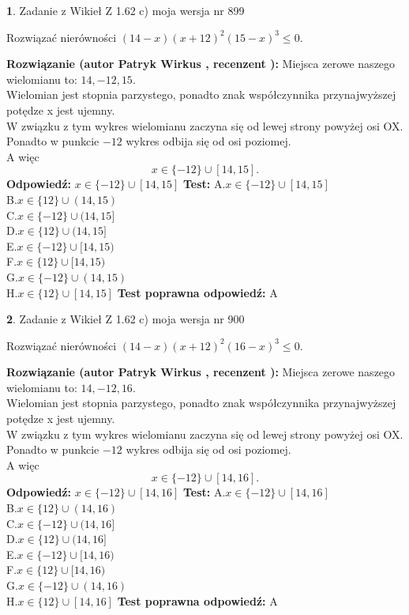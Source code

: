 \documentclass[12pt, a4paper]{article}
\theoremstyle{definition} %
\newtheorem{zad}{}
\newcommand{\zadStart}[1]{\begin{zad}#1\newline}
\newcommand{\zadStop}{\end{zad}}
\newcommand{\rozwStart}[2]{\noindent \textbf{Rozwiązanie (autor #1 , recenzent #2): }\newline}
\newcommand{\rozwStop}{\newline}
\newcommand{\odpStart}{\noindent \textbf{Odpowiedź:}\newline}
\newcommand{\odpStop}{\newline}
\newcommand{\testStart}{\noindent \textbf{Test:}\newline}
\newcommand{\testStop}{\newline}
\newcommand{\kluczStart}{\noindent \textbf{Test poprawna odpowiedź:}\newline}
\newcommand{\kluczStop}{\newline}
\begin{document}
\zadStart{Zadanie z Wikieł Z 1.62 c) moja wersja nr 899}

Rozwiązać nierówności $(14-x)(x+12)^{2}(15-x)^{3}\le0$.
\zadStop
\rozwStart{Patryk Wirkus}{}
Miejsca zerowe naszego wielomianu to: $14, -12, 15$.\\
Wielomian jest stopnia parzystego, ponadto znak współczynnika przy\linebreak najwyższej potędze x jest ujemny.\\ W związku z tym wykres wielomianu zaczyna się od lewej strony powyżej osi OX.\\
Ponadto w punkcie $-12$ wykres odbija się od osi poziomej.\\
A więc $$x \in \{-12\} \cup [14,15].$$
\rozwStop
\odpStart
$x \in \{-12\} \cup [14,15]$
\odpStop
\testStart
A.$x \in \{-12\} \cup [14,15]$\\
B.$x \in \{12\} \cup (14,15)$\\
C.$x \in \{-12\} \cup (14,15]$\\
D.$x \in \{12\} \cup (14,15]$\\
E.$x \in \{-12\} \cup [14,15)$\\
F.$x \in \{12\} \cup [14,15)$\\
G.$x \in \{-12\} \cup (14,15)$\\
H.$x \in \{12\} \cup [14,15]$
\testStop
\kluczStart
A
\kluczStop



\zadStart{Zadanie z Wikieł Z 1.62 c) moja wersja nr 900}

Rozwiązać nierówności $(14-x)(x+12)^{2}(16-x)^{3}\le0$.
\zadStop
\rozwStart{Patryk Wirkus}{}
Miejsca zerowe naszego wielomianu to: $14, -12, 16$.\\
Wielomian jest stopnia parzystego, ponadto znak współczynnika przy\linebreak najwyższej potędze x jest ujemny.\\ W związku z tym wykres wielomianu zaczyna się od lewej strony powyżej osi OX.\\
Ponadto w punkcie $-12$ wykres odbija się od osi poziomej.\\
A więc $$x \in \{-12\} \cup [14,16].$$
\rozwStop
\odpStart
$x \in \{-12\} \cup [14,16]$
\odpStop
\testStart
A.$x \in \{-12\} \cup [14,16]$\\
B.$x \in \{12\} \cup (14,16)$\\
C.$x \in \{-12\} \cup (14,16]$\\
D.$x \in \{12\} \cup (14,16]$\\
E.$x \in \{-12\} \cup [14,16)$\\
F.$x \in \{12\} \cup [14,16)$\\
G.$x \in \{-12\} \cup (14,16)$\\
H.$x \in \{12\} \cup [14,16]$
\testStop
\kluczStart
A
\kluczStop
\end{document}
